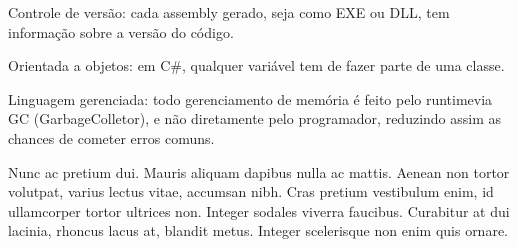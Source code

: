 \begin{alineascomponto}
	\item Controle de versão: cada assembly gerado, seja como EXE ou DLL, tem informação sobre a versão do código. 

	\item Orientada a objetos: em C#, qualquer variável tem de fazer parte de uma classe.  

	\item Linguagem gerenciada: todo gerenciamento de memória é feito pelo runtimevia GC (GarbageColletor), e não diretamente pelo programador, reduzindo assim as chances de cometer erros comuns.


Nunc ac pretium dui. Mauris aliquam dapibus nulla ac mattis. Aenean non tortor volutpat, varius lectus vitae, accumsan nibh. Cras pretium vestibulum enim, id ullamcorper tortor ultrices non. Integer sodales viverra faucibus. Curabitur at dui lacinia, rhoncus lacus at, blandit metus. Integer scelerisque non enim quis ornare.

	\begin{quadro}[h!]	
		\centering
	\end{quadro}
	
\lipsum[20]

	
	\begin{quadro}[h!]	
		\centering
	\end{quadro}


\end{alineascomponto}
